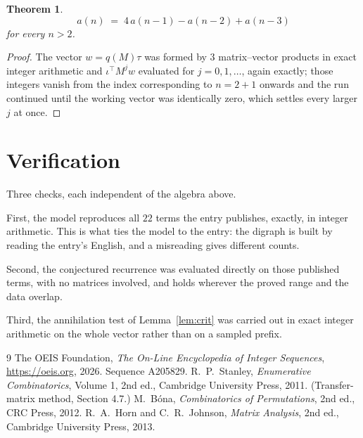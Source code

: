 \documentclass[11pt,a4paper]{article}
\theoremstyle{plain}
\newtheorem{theorem}{Theorem}
\theoremstyle{definition}
\begin{document}
\begin{theorem}
\[
a(n)\;=\;4\,a(n-1) - a(n-2) + a(n-3)
\]
for every $n>2$.
\end{theorem}

\begin{proof}
The vector $w=q(M)\tau$ was formed by $3$ matrix--vector products in exact integer
arithmetic and $\iota^{\!\top}M^{j}w$ evaluated for $j=0,1,\dots$, again exactly; those
integers vanish from the index corresponding to $n=2+1$ onwards and the run continued
until the working vector was identically zero, which settles every larger $j$ at once.
\end{proof}

\section{Verification}

Three checks, each independent of the algebra above.

First, the model reproduces all $22$ terms the entry publishes, exactly, in integer
arithmetic. This is what ties the model to the entry: the digraph is built by reading the
entry's English, and a misreading gives different counts.

Second, the conjectured recurrence was evaluated directly on those published terms, with no
matrices involved, and holds wherever the proved range and the data overlap.

Third, the annihilation test of Lemma~\ref{lem:crit} was carried out in exact integer
arithmetic on the whole vector rather than on a sampled prefix.

\begin{thebibliography}{9}
 The OEIS Foundation, \emph{The On-Line Encyclopedia of Integer
Sequences}, \url{https://oeis.org}, 2026. Sequence A205829.
 R.~P.~Stanley, \emph{Enumerative Combinatorics}, Volume 1, 2nd ed.,
Cambridge University Press, 2011. (Transfer-matrix method, Section 4.7.)
 M.~B\'ona, \emph{Combinatorics of Permutations}, 2nd ed., CRC
Press, 2012.
 R.~A.~Horn and C.~R.~Johnson, \emph{Matrix Analysis}, 2nd ed., Cambridge
University Press, 2013.
\end{thebibliography}
\end{document}
